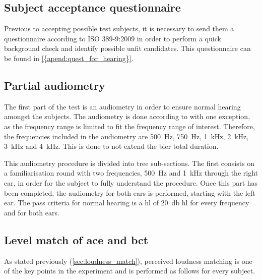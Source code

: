 \subsection{Subject acceptance questionnaire}
Previous to accepting possible test subjects, it is necessary to send them a questionnaire according to ISO 389-9:2009 \citep{iso_389-9} in order to perform a quick background check and identify possible unfit candidates. This questionnaire can be found in \autoref{{apend:quest_for_hearing}}.
  
\subsection{Partial audiometry}
The first part of the test is an audiometry in order to ensure normal hearing amongst the subjects. The audiometry is done according to \citep{iso_8253-2} with one exception, as the frequency range is limited to fit the frequency range of interest. Therefore, the frequencies included in the audiometry are \SI{500}{\hertz}, \SI{750}{\hertz}, \SI{1}{\kilo\hertz}, \SI{2}{\kilo\hertz}, \SI{3}{\kilo\hertz} and \SI{4}{\kilo\hertz}. This is done to not extend the \gls{bier} total duration.

This audiometry procedure is divided into tree sub-sections. The first consists on a familiarisation round with two frequencies, \SI{500}{\hertz} and \SI{1}{\kilo\hertz} through the right ear, in order for the subject to fully understand the procedure. Once this part has been completed, the audiometry for both ears is performed, starting with the left ear. The pass criteria for normal hearing is a \gls{hl} of \SI{20}{\decibel} \gls{hl} for every frequency and for both ears.
   
\subsection{Level match of \gls{ace} and \gls{bct}}\label{ssec:match}
As stated previously (\autoref{sec:loudness_match}), perceived loudness matching is one of the key points in the experiment and is performed as follows for every subject. 

